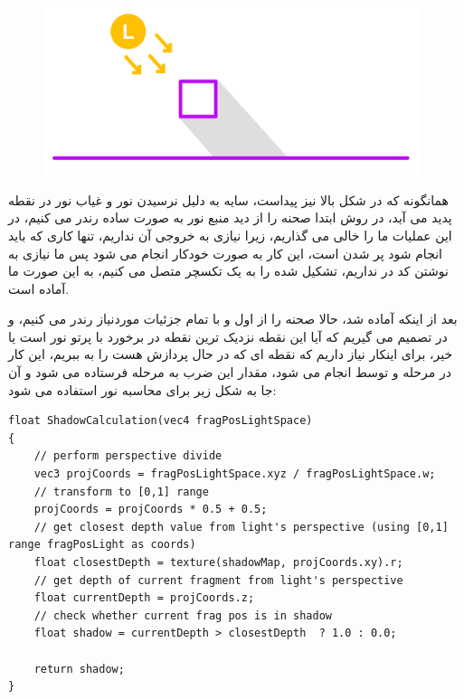 \documentclass[a4paper, 12pt]{book}
\newcommand{\lrit}[1]{\lr{\textit{#1}}}
\begin{document}
\begin{figure}[H]
    \centering
    \href{https://github.com/devprofile98/shm}{
        \includegraphics[width=11cm]{images/shadow.png}
    }
    \caption{}
    \label{fig:my_label}
\end{figure}

    همانگونه که در شکل بالا نیز پیداست، سایه به دلیل نرسیدن نور و غیاب نور در نقطه پدید می آید، در روش  ابتدا صحنه را از دید منبع نور به صورت ساده رندر می کنیم، در این عملیات ما  را خالی می گذاریم، زیرا نیازی به خروجی آن نداریم، تنها کاری که باید انجام شود پر شدن  است، این کار به صورت خودکار انجام می شود پس ما نیازی به نوشتن کد در  نداریم،  تشکیل شده را به یک تکسچر متصل می کنیم، به این صورت  ما آماده است.\par
    بعد از اینکه  آماده شد، حالا صحنه را از اول و با تمام جزئیات موردنیاز رندر می کنیم، و در  تصمیم می گیریم که آیا این نقطه نزدیک ترین نقطه در برخورد با پرتو نور است یا خیر، برای اینکار نیاز داریم که نقطه ای که در حال پردازش هست را به  ببریم، این کار در مرحله  و توسط  انجام می شود، مقدار این ضرب به مرحله  فرستاده می شود و آن جا به شکل زیر برای محاسبه نور استفاده می شود:
    
    \begin{LTR}
    \small
        \begin{lstlisting}[style=C++Style,caption=\lrit{calculate shadow}]
float ShadowCalculation(vec4 fragPosLightSpace)
{
    // perform perspective divide
    vec3 projCoords = fragPosLightSpace.xyz / fragPosLightSpace.w;
    // transform to [0,1] range
    projCoords = projCoords * 0.5 + 0.5;
    // get closest depth value from light's perspective (using [0,1] range fragPosLight as coords)
    float closestDepth = texture(shadowMap, projCoords.xy).r;
    // get depth of current fragment from light's perspective
    float currentDepth = projCoords.z;
    // check whether current frag pos is in shadow
    float shadow = currentDepth > closestDepth  ? 1.0 : 0.0;

    return shadow;
} 
        \end{lstlisting}
    \end{LTR}
    \normalsize
    \vspace*{0.3cm}
    
\end{document}
